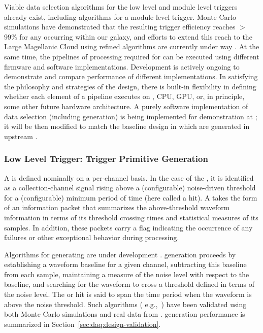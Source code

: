 Viable data selection algorithms for the low level and module level triggers already exist, including
algorithms for a module level  trigger.  Monte Carlo simulations have demonstrated that the resulting
 trigger efficiency reaches $>$99\% for any 
occurring within our galaxy, and efforts to extend this reach to the
Large Magellanic Cloud using refined algorithms are currently under way \cite{bib:docdb11215,bib:docdb14522}. At the same time, the
pipelines of processing required 
for  can be executed using different firmware and software
implementations. Development is actively ongoing to demonstrate
and compare performance of different implementations. In satisfying
the philosophy and strategies of the  design, there is built-in
flexibility in defining whether each element of a pipeline executes on
, CPU, GPU, or, in principle, some other future hardware
architecture. A purely software implementation of data selection
(including  generation) is being
implemented for demonstration at ; it will be then
modified to match the baseline design in which  are
generated in upstream  .


\subsubsection{Low Level Trigger: Trigger Primitive Generation}
\label{sec:daq:design-trigger-primitives}

A  is defined nominally on a per-channel basis. In the case of
the  , it is identified as a
collection-channel signal rising above a (configurable) noise-driven
threshold for a (configurable) minimum period of time (here called a
hit).
A  takes the form of an information packet that 
summarizes the above-threshold waveform information in terms of its
threshold crossing times and statistical measures of its  samples. 
In addition, these packets carry a flag indicating the occurrence of any
failures or other exceptional behavior during  processing.


Algorithms for generating  are under development
\cite{bib:docdb11275}.   generation proceeds
by establishing a waveform baseline
for a given channel, subtracting this baseline from each sample, maintaining
a measure of the noise level with respect to the baseline, and searching for the waveform to cross a
threshold defined in terms of the noise level. 
The   or hit is said to span the time period when the waveform is above the noise threshold.
Such algorithms ( e.g.,~\cite{bib:docdb11236}) have been validated
using both Monte Carlo simulations and 
real data from . 
 generation performance is summarized in
Section~\ref{sec:daq:design-validation}.


